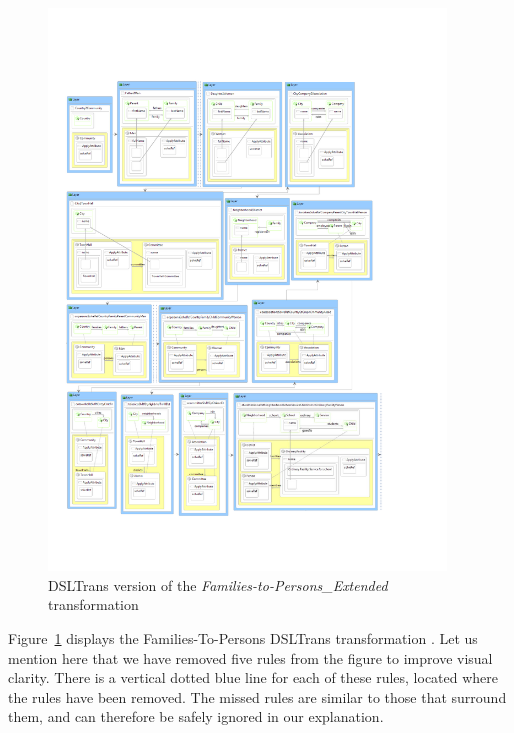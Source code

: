 \begin{figure}
  \begin{center}
  \includegraphics[width=0.94\textwidth]{figures/FamToPersons/DSLTrans_Rules_javi}
  \caption{DSLTrans version of the \emph{Families-to-Persons\_Extended} transformation}
  \label{fig:DSLTrans_rules}
  \end{center}
\end{figure}


Figure~\ref{fig:DSLTrans_rules} displays the Families-To-Persons DSLTrans transformation . Let us mention here that we have removed five rules from the figure to improve visual clarity.
There is a vertical dotted blue line for each of these rules, located where the rules have been removed. The missed rules are similar to those that surround them, and can therefore be safely ignored in our explanation.



